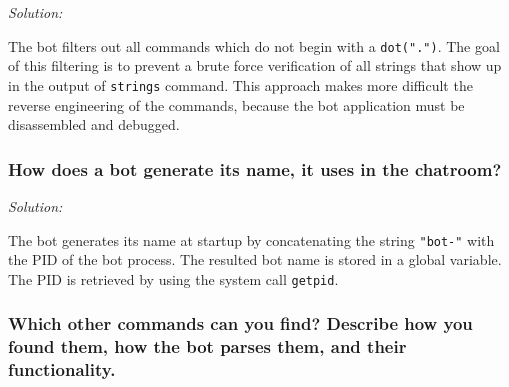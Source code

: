 \documentclass[a4paper,11pt]{article}
\newenvironment{solution}%
{\par{\noindent\small\textit{Solution:}}\vspace{-12pt}\begin{framed}}%
{\end{framed}\par}
\begin{document}
\ifsolution
\begin{solution}
The bot filters out all commands which do not begin with a \texttt{dot(".")}. The goal of this filtering is to prevent a brute force verification of all strings that show up in the output of \texttt{strings} command. This approach makes more difficult the reverse engineering of the commands, because the bot application must be disassembled and debugged.
\end{solution}\fi


\subsubsection*{How does a bot generate its name, it uses in the chatroom?}
\ifsolution
\begin{solution}
The bot generates its name at startup by concatenating the string \texttt{"bot-"} with the PID of the bot process. The resulted bot name is stored in a global variable. The PID is retrieved by using the system call \texttt{getpid}. 

\end{solution}\fi

\subsubsection*{Which other commands can you find? Describe how you found them,
how the bot parses them, and their functionality.}
\end{document}
